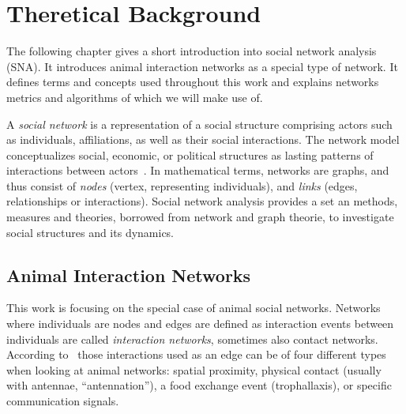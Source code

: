 \chapter{Theretical Background}
\label{ch:bg}
The following chapter gives a short introduction into social network analysis (SNA). It introduces animal interaction networks as a special type of network. It defines terms and concepts used throughout this work and explains networks metrics and algorithms of which we will make use of.

A \emph{social network} is a representation of a social structure comprising actors such as individuals, affiliations, as well as their social interactions.
The network model conceptualizes social, economic, or political structures as lasting patterns of interactions between actors~\cite{wasserman1994social}.
In mathematical terms, networks are graphs, and thus consist of \emph{nodes} (vertex, representing individuals), and \emph{links} (edges, relationships or interactions).
Social network analysis provides a set an methods, measures and theories, borrowed from network and graph theorie, to investigate social structures and its dynamics.

\section{Animal Interaction Networks}
\label{sec:animalNW}
This work is focusing on the special case of animal social networks.
Networks where individuals are nodes and edges are defined as interaction events between individuals are called \emph{interaction networks}, sometimes also contact networks. 
According to~\textcite{charbonneau2013social} those interactions used as an edge can be of four different types when looking at animal networks: spatial proximity, physical contact (usually with antennae, “antennation”), a food exchange event (trophallaxis), or specific communication signals.

